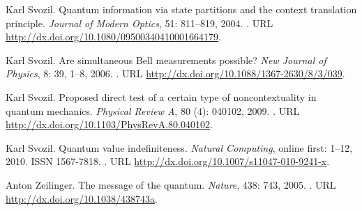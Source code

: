 \documentclass[runningheads]{llncs}
\begin{document}
\begin{thebibliography}{25}
Karl Svozil.
\newblock Quantum information via state partitions and the context translation
  principle.
\newblock \emph{Journal of Modern Optics}, 51: 811--819, 2004.
\newblock {}.
\newblock URL \url{http://dx.doi.org/10.1080/09500340410001664179}.

Karl Svozil.
\newblock Are simultaneous {B}ell measurements possible?
\newblock \emph{New Journal of Physics}, 8: 39, 1--8, 2006.
\newblock {}.
\newblock URL \url{http://dx.doi.org/10.1088/1367-2630/8/3/039}.

Karl Svozil.
\newblock Proposed direct test of a certain type of noncontextuality in quantum
  mechanics.
\newblock \emph{Physical Review A}, 80 (4): 040102, 2009.
\newblock {}.
\newblock URL \url{http://dx.doi.org/10.1103/PhysRevA.80.040102}.

Karl Svozil.
\newblock Quantum value indefiniteness.
\newblock \emph{Natural Computing}, online first: 1--12, 2010.
\newblock ISSN 1567-7818.
\newblock {}.
\newblock URL \url{http://dx.doi.org/10.1007/s11047-010-9241-x}.

Anton Zeilinger.
\newblock The message of the quantum.
\newblock \emph{Nature}, 438: 743, 2005.
\newblock {}.
\newblock URL \url{http://dx.doi.org/10.1038/438743a}.

\end{thebibliography}
\end{document}

